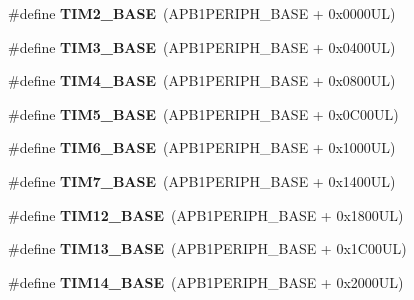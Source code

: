 \begin{DoxyCompactItemize}
\#define {\bfseries T\+I\+M2\+\_\+\+B\+A\+SE}~(A\+P\+B1\+P\+E\+R\+I\+P\+H\+\_\+\+B\+A\+SE + 0x0000\+U\+L)
\item 
\mbox{\label{group___peripheral__memory__map_gaf0c34a518f87e1e505cd2332e989564a}} 
\#define {\bfseries T\+I\+M3\+\_\+\+B\+A\+SE}~(A\+P\+B1\+P\+E\+R\+I\+P\+H\+\_\+\+B\+A\+SE + 0x0400\+U\+L)
\item 
\mbox{\label{group___peripheral__memory__map_ga56e2d44b0002f316527b8913866a370d}} 
\#define {\bfseries T\+I\+M4\+\_\+\+B\+A\+SE}~(A\+P\+B1\+P\+E\+R\+I\+P\+H\+\_\+\+B\+A\+SE + 0x0800\+U\+L)
\item 
\mbox{\label{group___peripheral__memory__map_ga3e1671477190d065ba7c944558336d7e}} 
\#define {\bfseries T\+I\+M5\+\_\+\+B\+A\+SE}~(A\+P\+B1\+P\+E\+R\+I\+P\+H\+\_\+\+B\+A\+SE + 0x0\+C00\+U\+L)
\item 
\mbox{\label{group___peripheral__memory__map_ga8268ec947929f192559f28c6bf7d1eac}} 
\#define {\bfseries T\+I\+M6\+\_\+\+B\+A\+SE}~(A\+P\+B1\+P\+E\+R\+I\+P\+H\+\_\+\+B\+A\+SE + 0x1000\+U\+L)
\item 
\mbox{\label{group___peripheral__memory__map_ga0ebf54364c6a2be6eb19ded6b18b6387}} 
\#define {\bfseries T\+I\+M7\+\_\+\+B\+A\+SE}~(A\+P\+B1\+P\+E\+R\+I\+P\+H\+\_\+\+B\+A\+SE + 0x1400\+U\+L)
\item 
\mbox{\label{group___peripheral__memory__map_ga33dea32fadbaecea161c2ef7927992fd}} 
\#define {\bfseries T\+I\+M12\+\_\+\+B\+A\+SE}~(A\+P\+B1\+P\+E\+R\+I\+P\+H\+\_\+\+B\+A\+SE + 0x1800\+U\+L)
\item 
\mbox{\label{group___peripheral__memory__map_gad20f79948e9359125a40bbf6ed063590}} 
\#define {\bfseries T\+I\+M13\+\_\+\+B\+A\+SE}~(A\+P\+B1\+P\+E\+R\+I\+P\+H\+\_\+\+B\+A\+SE + 0x1\+C00\+U\+L)
\item 
\mbox{\label{group___peripheral__memory__map_ga862855347d6e1d92730dfe17ee8e90b8}} 
\#define {\bfseries T\+I\+M14\+\_\+\+B\+A\+SE}~(A\+P\+B1\+P\+E\+R\+I\+P\+H\+\_\+\+B\+A\+SE + 0x2000\+U\+L)

\end{DoxyCompactItemize}
